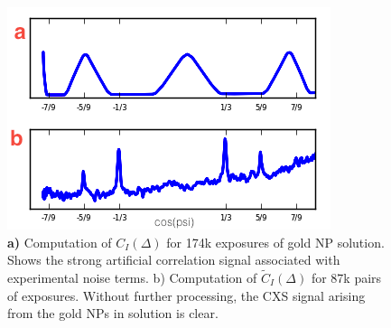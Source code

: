 \documentclass [11pt,fleqn]{article}
\begin{document}
\begin{figure}[h]
\begin{center}
\includegraphics[width=\textwidth,height=\textheight,keepaspectratio]{./raw_dif.png}
\end{center}
\caption{\textbf{a)} Computation of $C_I(\Delta)$ for 174k exposures of gold NP solution. Shows the strong artificial correlation signal associated with experimental noise terms. b) Computation of $\tilde C_I(\Delta)$ for 87k pairs of exposures. Without further processing, the CXS signal arising from the gold NPs in solution is clear.}
\label{fig:raw_dif}
\end{figure}
\end{document}
